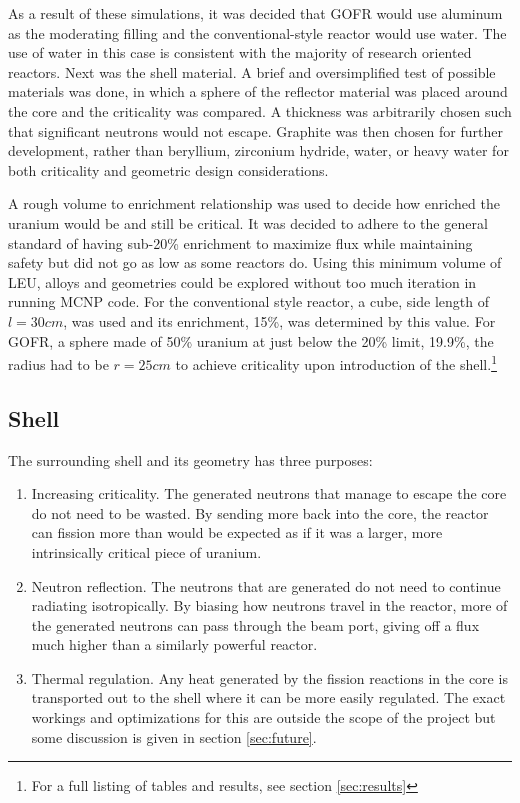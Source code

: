 As a result of these simulations, it was decided that GOFR would use aluminum as the moderating filling and the conventional-style reactor would use water. The use of water in this case is consistent with the majority of research oriented reactors. Next was the shell material. A brief and oversimplified test of possible materials was done, in which a sphere of the reflector material was placed around the core and the criticality was compared. A thickness was arbitrarily chosen such that significant neutrons would not escape. Graphite was then chosen for further development, rather than beryllium, zirconium hydride, water, or heavy water for both criticality and geometric design considerations.

A rough volume to enrichment relationship was used to decide how enriched the uranium would be and still be critical. It was decided to adhere to the general standard of having sub-20\% enrichment to maximize flux while maintaining safety but did not go as low as some reactors do. Using this minimum volume of LEU, alloys and geometries could be explored without too much iteration in running MCNP code. For the conventional style reactor, a cube, side length of $l=30cm$, was used and its enrichment, 15\%, was determined by this value. For GOFR, a sphere made of 50\% uranium at just below the 20\% limit, 19.9\%, the radius had to be $r=25cm$ to achieve criticality upon introduction of the shell.\footnote{For a full listing of tables and results, see section \ref{sec:results}}

\subsection{Shell}

The surrounding shell and its geometry has three purposes:

\begin{enumerate}
	\item Increasing criticality.
	The generated neutrons that manage to escape the core do not need to be wasted. By sending more back into the core, the reactor can fission more than would be expected as if it was a larger, more intrinsically critical piece of uranium.
	\item Neutron reflection.
	The neutrons that are generated do not need to continue radiating isotropically. By biasing how neutrons travel in the reactor, more of the generated neutrons can pass through the beam port, giving off a flux much higher than a similarly powerful reactor.
	\item Thermal regulation.
	Any heat generated by the fission reactions in the core is transported out to the shell where it can be more easily regulated. The exact workings and optimizations for this are outside the scope of the project but some discussion is given in section \ref{sec:future}.
\end{enumerate}

